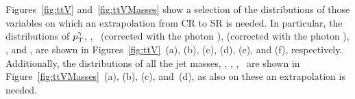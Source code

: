 		Figures~\ref{fig:ttV} and~\ref{fig:ttVMasses} show a selection of the distributions of those variables on which an extrapolation from \ac{CR} to \ac{SR} is needed. In particular, the distributions of $p_{\mathrm{T}}^{\gamma}$, \mttwo, \mtbmin\ (corrected with the photon \pt), \mtbmax (corrected with the photon \pt), \HT, and \drbb, are shown in Figures~\ref{fig:ttV}~(a), (b), (c), (d), (e), and (f), respectively. Additionally, the distributions of all the jet masses, \mantikttwelvezero, \mantikttwelveone, \mantikteightzero, \mantikteightone\ are shown in Figure~\ref{fig:ttVMasses}~(a), (b), (c), and~(d), as also on these an extrapolation is needed.

		\begin{figure}[htbp]
		\centering

\end{figure}
